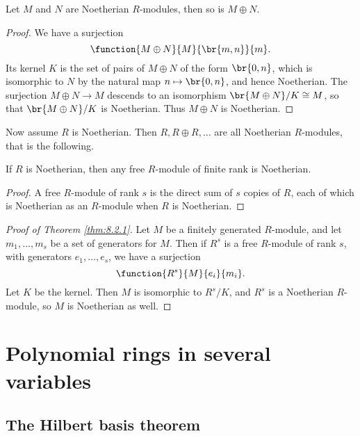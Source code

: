 \begin{corollary}
Let $ M $ and $ N $ are Noetherian $ R $-modules, then so is $ M \oplus N $.
\end{corollary}

\begin{proof}
We have a surjection
$$ \function{M \oplus N}{M}{\br{m, n}}{m}. $$
Its kernel $ K $ is the set of pairs of $ M \oplus N $ of the form $ \br{0, n} $, which is isomorphic to $ N $ by the natural map $ n \mapsto \br{0, n} $, and hence Noetherian. The surjection $ M \oplus N \to M $ descends to an isomorphism $ \br{M \oplus N} / K \cong M $, so that $ \br{M \oplus N} / K $ is Noetherian. Thus $ M \oplus N $ is Noetherian.
\end{proof}

Now assume $ R $ is Noetherian. Then $ R, R \oplus R, \dots $ are all Noetherian $ R $-modules, that is the following.

\begin{corollary}
If $ R $ is Noetherian, then any free $ R $-module of finite rank is Noetherian.
\end{corollary}

\begin{proof}
A free $ R $-module of rank $ s $ is the direct sum of $ s $ copies of $ R $, each of which is Noetherian as an $ R $-module when $ R $ is Noetherian.
\end{proof}

\begin{proof}[Proof of Theorem \ref{thm:8.2.1}]
Let $ M $ be a finitely generated $ R $-module, and let $ m_1, \dots, m_s $ be a set of generators for $ M $. Then if $ R^s $ is a free $ R $-module of rank $ s $, with generators $ e_1, \dots, e_s $, we have a surjection
$$ \function{R^s}{M}{e_i}{m_i}. $$
Let $ K $ be the kernel. Then $ M $ is isomorphic to $ R^s / K $, and $ R^s $ is a Noetherian $ R $-module, so $ M $ is Noetherian as well.
\end{proof}

\pagebreak

\section{Polynomial rings in several variables}

\subsection{The Hilbert basis theorem}

